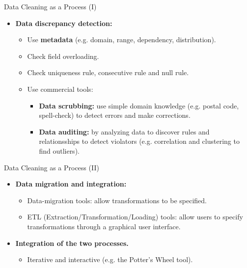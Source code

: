 \begin{frame}{Data Cleaning as a Process (I)}
	\begin{itemize}
		\item \textbf{Data discrepancy detection:}
		\begin{itemize}
			\item Use \textbf{\color{airforceblue}metadata} (e.g. domain, 
			range, dependency, distribution).
			\item Check field overloading.
			\item Check uniqueness rule, consecutive rule and null rule.
			\item Use commercial tools:
			\begin{itemize}
				\item \textbf{\color{airforceblue}Data scrubbing:} use simple 
				domain knowledge (e.g. postal code, spell-check) to detect 
				errors and make corrections.
				\item \textbf{\color{airforceblue}Data auditing:} by analyzing 
				data to discover rules and relationsships to detect violators 
				(e.g. correlation and clustering to find outliers).
			\end{itemize}
		\end{itemize}
	\end{itemize}
\end{frame}

\begin{frame}{Data Cleaning as a Process (II)}
	\begin{itemize}
		\item \textbf{Data migration and integration:}
		\begin{itemize}
			\item Data-migration tools: allow transformations to be 
			specified.
			\item ETL (Extraction/Transformation/Loading) tools: allow 
			users to specify transformations through a graphical user 
			interface.
		\end{itemize}
		\item \textbf{Integration of the two processes.}
		\begin{itemize}
			\item Iterative and interactive (e.g. the Potter's Wheel tool).
		\end{itemize}
	\end{itemize}
\end{frame}


